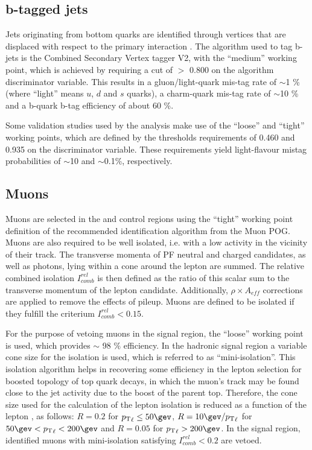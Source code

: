 \subsection{b-tagged jets}
\label{sec:btags}
Jets originating from bottom quarks are identified through vertices
that are displaced with respect to the primary interaction
\cite{Chatrchyan:2012jua}.  The algorithm used to tag b-jets is the
Combined Secondary Vertex tagger V2, with the ``medium'' working
point, which is achieved by requiring a cut of $>$ 0.800 on the
algorithm discriminator variable.  This results in a gluon/light-quark
mis-tag rate of $\sim$1 \% (where ``light'' means $u$, $d$ and $s$
quarks), a charm-quark mis-tag rate of $\sim$10 \% and a b-quark b-tag
efficiency of about 60 \%. 

Some validation studies used by the analysis make use of the ``loose''
and ``tight'' working points, which are defined by the thresholds
requirements of 0.460 and 0.935 on the discriminator variable. These
requirements yield light-flavour mistag probabilities of $\sim$10 and
$\sim$0.1\%, respectively.


\subsection{Muons}
\label{sec:muon-id}
Muons are selected in the \mj and \mmj control regions using the ``tight'' working point 
definition of the recommended identification algorithm from the Muon POG. 
Muons are also required to be well isolated, i.e. with a low activity in the vicinity of their track. 
The transverse momenta of PF neutral and charged candidates, as well as photons, lying within a cone around the lepton are summed. 
The relative combined isolation $I^{rel}_{comb}$ is then defined as 
the ratio of this scalar sum to the transverse momentum of the lepton
candidate. Additionally, $\rho\times A_{eff}$ corrections are applied to
remove the effects of pileup.
Muons are defined to be isolated if they fulfill the criterium $I^{rel}_{comb} < 0.15$. 

For the purpose of vetoing muons in the signal region, the ``loose'' working point 
is used, which provides $\sim$ 98 $\%$ efficiency. 
In the hadronic signal region a variable cone size for the isolation is used, which is referred to as ``mini-isolation''. 
This isolation algorithm helps in recovering some efficiency in the lepton selection for boosted topology of top quark decays, 
in which the muon's track may be found close to the jet activity due to the boost of the parent top. 
Therefore, the cone size used for the calculation of the lepton isolation is reduced as a function of 
the lepton \Pt, as follows: $R=0.2$ for $\Pt_{\ell}\leq50\gev$,
$R=10\gev/\Pt_{\ell}$ for $50 \gev < \Pt_{\ell} < 200\gev$ and $R=0.05$ for $\Pt_{\ell} > 200 \gev$.
In the signal region, identified muons with mini-isolation satisfying $I^{rel}_{comb} < 0.2$ are vetoed.


